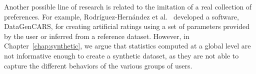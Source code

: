Another possible line of research is related to the imitation of a real collection of preferences. For example, Rodr{\'i}guez-Hern{\'a}ndez et al.~\cite{CarmenRodriguez-Hernandez2017} developed a software, DataGenCARS, for creating artificial ratings using a set of parameters provided by the user or inferred from a reference dataset. However, in Chapter~\ref{chap:synthetic}, we argue that statistics computed at a global level are not informative enough to create a synthetic dataset, as they are not able to capture the different behaviors of the various groups of users.
